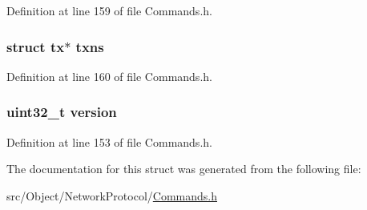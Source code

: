 Definition at line 159 of file Commands.h.

\hypertarget{struct_cmdblock_a4e32cc9ad3444c21452f9445fb3eb9ab}{
\subsubsection[{txns}]{\setlength{\rightskip}{0pt plus 5cm}struct tx$\ast$ {\bf txns}}}
\label{struct_cmdblock_a4e32cc9ad3444c21452f9445fb3eb9ab}


Definition at line 160 of file Commands.h.

\hypertarget{struct_cmdblock_acd99bb05ca015e7d74448acb1deba7ca}{
\subsubsection[{version}]{\setlength{\rightskip}{0pt plus 5cm}uint32\_\-t {\bf version}}}
\label{struct_cmdblock_acd99bb05ca015e7d74448acb1deba7ca}


Definition at line 153 of file Commands.h.



The documentation for this struct was generated from the following file:\begin{DoxyCompactItemize}
\item 
src/Object/NetworkProtocol/\hyperlink{_commands_8h}{Commands.h}\end{DoxyCompactItemize}
